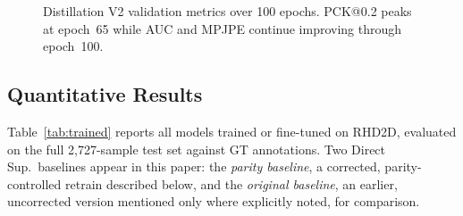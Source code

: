 \documentclass[11pt,conference,a4paper]{APSIPA2026}
\begin{document}
\begin{figure}[!t]
\caption{Distillation V2 validation metrics over 100 epochs.
PCK@0.2 peaks at epoch~65 while AUC and MPJPE continue improving
through epoch~100.}
\label{fig:learning_curves}
\end{figure}

\subsection{Quantitative Results}
\label{sec:quant}

Table~\ref{tab:trained} reports all models trained or fine-tuned on
RHD2D, evaluated on the full 2,727-sample test set against GT
annotations. Two Direct Sup.\ baselines appear in this paper: the
\emph{parity baseline}, a corrected, parity-controlled retrain
described below, and the \emph{original baseline}, an earlier,
uncorrected version mentioned only where explicitly noted, for
comparison.
\end{document}
